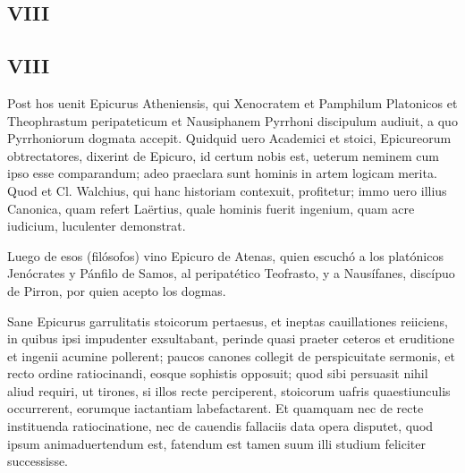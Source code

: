\documentclass{article}
\begin{document}
\begin{paracol}{2}

  \subsection*{VIII}

  \switchcolumn

  \subsection*{VIII}

  \switchcolumn

  Post hos uenit Epicurus Atheniensis, qui Xenocratem et Pamphilum Platonicos et Theophrastum peripateticum et Nausiphanem Pyrrhoni discipulum audiuit, a quo Pyrrhoniorum dogmata accepit. Quidquid uero Academici et stoici, Epicureorum obtrectatores, dixerint de Epicuro, id certum nobis est, ueterum neminem cum ipso esse comparandum; adeo praeclara sunt hominis in artem logicam merita. Quod et Cl. Walchius, qui hanc historiam contexuit, profitetur; immo uero illius Canonica, quam refert Laërtius, quale hominis fuerit ingenium, quam acre iudicium, luculenter demonstrat.

  \switchcolumn

  Luego de esos (filósofos) vino Epicuro de Atenas, quien escuchó a los platónicos Jenócrates y Pánfilo de Samos, al peripatético Teofrasto, y a Nausífanes, discípuo de Pirron, por quien acepto los dogmas.

  \switchcolumn


  Sane Epicurus garrulitatis stoicorum pertaesus, et ineptas cauillationes reiiciens, in quibus ipsi impudenter exsultabant, perinde quasi praeter ceteros et eruditione et ingenii acumine pollerent; paucos canones collegit de perspicuitate sermonis, et recto ordine ratiocinandi, eosque sophistis opposuit; quod sibi persuasit nihil aliud requiri, ut tirones, si illos recte perciperent, stoicorum uafris quaestiunculis occurrerent, eorumque iactantiam labefactarent. Et quamquam nec de recte instituenda ratiocinatione, nec de cauendis fallaciis data opera disputet, quod ipsum animaduertendum est, fatendum est tamen suum illi studium feliciter successisse.

\end{paracol}
\end{document}
